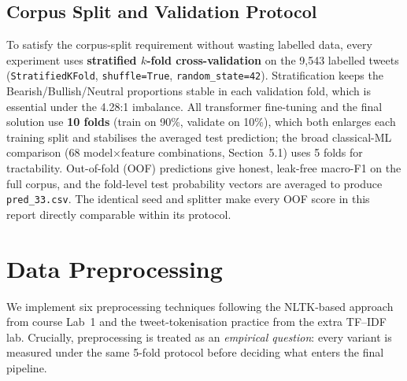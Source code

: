 \documentclass[11pt,a4paper]{article}
\begin{document}
\subsection{Corpus Split and Validation Protocol}
To satisfy the corpus-split requirement without wasting labelled data, every experiment uses
\textbf{stratified $k$-fold cross-validation} on the 9{,}543 labelled tweets
(\texttt{StratifiedKFold}, \texttt{shuffle=True}, \texttt{random\_state=42}). Stratification keeps
the Bearish/Bullish/Neutral proportions stable in each validation fold, which is essential under the
4.28:1 imbalance. All transformer fine-tuning and the final solution use \textbf{10 folds} (train
on 90\%, validate on 10\%), which both enlarges each training split and stabilises the averaged
test prediction; the broad classical-ML comparison (68 model$\times$feature combinations,
Section~5.1) uses 5 folds for tractability. Out-of-fold (OOF) predictions give honest, leak-free
macro-F1 on the full corpus, and the fold-level test probability vectors are averaged to produce
\texttt{pred\_33.csv}. The identical seed and splitter make every OOF score in this report directly
comparable within its protocol.

\section{Data Preprocessing}
We implement six preprocessing techniques following the NLTK-based approach from course Lab~1 and
the tweet-tokenisation practice from the extra TF--IDF lab. Crucially, preprocessing is treated as an
\emph{empirical question}: every variant is measured under the same 5-fold protocol before deciding
what enters the final pipeline.
\end{document}
